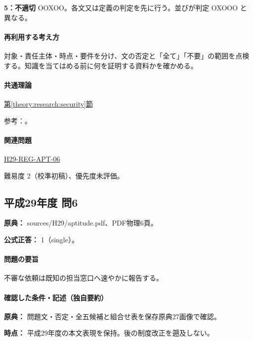 \noindent\textbf{5：不適切} OOXOO。各文又は定義の判定を先に行う。並びが判定 OXOOO と異なる。\par

\paragraph{再利用する考え方} 対象・責任主体・時点・要件を分け、文の否定と「全て」「不要」の範囲を点検する。知識を当てはめる前に何を証明する資料かを確かめる。

\paragraph{共通理論} \hyperref[theory:research:security]{第\ref*{theory:research:security}節}

\par 参考：\cite{saf53_ipa_cia}。

\paragraph{関連問題} \hyperref[q:h29-reg-apt-06]{H29-REG-APT-06}

\par 難易度 2（校準初稿）、優先度未評価。

\subsection{平成29年度 問6}
\label{q:h29-reg-apt-06}

\noindent\textbf{原典：} sources/H29/aptitude.pdf、PDF物理6頁。

\textbf{公式正答：} 1（single）。

\paragraph{問題の要旨} 不審な依頼は既知の担当窓口へ速やかに報告する。

\paragraph{確認した条件・記述（独自要約）}\mbox{}\par

\noindent\textbf{原典：} 問題文・否定・全五候補と組合せ表を保存原典27画像で確認。\par

\noindent\textbf{時点：} 平成29年度の本文表現を保持。後の制度改正を遡及しない。\par

